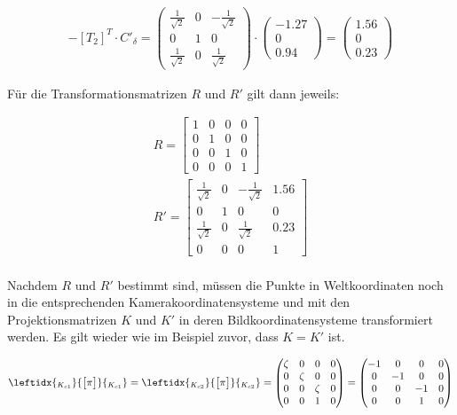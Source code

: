 \begin{gather}
	 -[T_2]^{T}\cdot C'_\delta = 
	 \begin{pmatrix}
	 \frac{1}{\sqrt{2}}&0&-\frac{1}{\sqrt{2}}\\
	 0&1&0\\
	 \frac{1}{\sqrt{2}}&0&\frac{1}{\sqrt{2}}
	 \end{pmatrix}
	 \cdot
	 \begin{pmatrix}
	 -1.27\\0\\0.94
	 \end{pmatrix}
	 =
	  \begin{pmatrix}
	 1.56\\0\\0.23
	 \end{pmatrix}
\end{gather}

Für die Transformationsmatrizen $R$ und $R'$ gilt dann jeweils:

\begin{gather}
	R = 
	\begin{bmatrix}
	1&0&0&0\\
	0&1&0&0\\
	0&0&1&0\\
	0&0&0&1
	\end{bmatrix}\\	
	R'=
	 \begin{bmatrix}
	\frac{1}{\sqrt{2}}&0&-\frac{1}{\sqrt{2}}&1.56\\
	0&1&0&0\\
	\frac{1}{\sqrt{2}}&0&\frac{1}{\sqrt{2}}&0.23\\
	0&0&0&1
	\end{bmatrix}
\end{gather}\\

Nachdem $R$ und $R'$ bestimmt sind,  müssen die Punkte in Weltkoordinaten noch in die entsprechenden Kamerakoordinatensysteme und mit den Projektionsmatrizen $K$ und $K'$ in deren Bildkoordinatensysteme transformiert werden. Es gilt wieder wie im Beispiel zuvor, dass $K = K'$ ist.

 \begin{gather}
 \leftidx{_{K_{c1}}}{\begin{bmatrix}
 	\pi
 	\end{bmatrix}}{_{K_{c1}}}
 =		\leftidx{_{K_{c2}}}{\begin{bmatrix}
 	\pi
 	\end{bmatrix}}{_{K_{c2}}}
 =
 \begin{pmatrix}
 \zeta&0&0&0\\
 0&\zeta&0&0\\
 0&0&\zeta&0\\
 0&0&1&0
 \end{pmatrix}=
 \begin{pmatrix}
 -1&0&0&0\\
 0&-1&0&0\\
 0&0&-1&0\\
 0&0&1&0
 \end{pmatrix}
 \end{gather}
 

